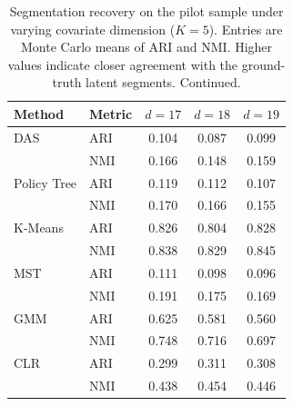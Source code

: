 \begin{table}[htbp]
\centering
\caption{Segmentation recovery on the pilot sample under varying covariate dimension ($K=5$). Entries are Monte Carlo means of ARI and NMI. Higher values indicate closer agreement with the ground-truth latent segments. Continued.}
\label{tab:app-ari-nmi-varying-d-cont}
\begin{tabular}{llccc}
\toprule
Method & Metric & $d=17$ & $d=18$ & $d=19$ \\
\midrule
DAS & ARI & 0.104 & 0.087 & 0.099 \\
 & NMI & 0.166 & 0.148 & 0.159 \\
\addlinespace
Policy Tree & ARI & 0.119 & 0.112 & 0.107 \\
 & NMI & 0.170 & 0.166 & 0.155 \\
\addlinespace
K-Means & ARI & 0.826 & 0.804 & 0.828 \\
 & NMI & 0.838 & 0.829 & 0.845 \\
\addlinespace
MST & ARI & 0.111 & 0.098 & 0.096 \\
 & NMI & 0.191 & 0.175 & 0.169 \\
\addlinespace
GMM & ARI & 0.625 & 0.581 & 0.560 \\
 & NMI & 0.748 & 0.716 & 0.697 \\
\addlinespace
CLR & ARI & 0.299 & 0.311 & 0.308 \\
 & NMI & 0.438 & 0.454 & 0.446 \\
\bottomrule
\end{tabular}
\end{table}
